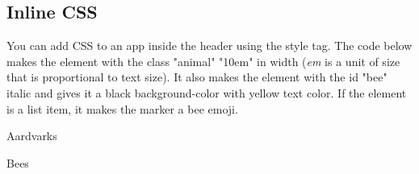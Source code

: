 \documentclass[
  oneside]{book}
\newenvironment{Shaded}{\begin{snugshade}}{\end{snugshade}}
\newcommand{\AttributeTok}[1]{\textcolor[rgb]{0.77,0.63,0.00}{#1}}
\newcommand{\FunctionTok}[1]{\textcolor[rgb]{0.00,0.00,0.00}{#1}}
\newcommand{\NormalTok}[1]{#1}
\newcommand{\OtherTok}[1]{\textcolor[rgb]{0.56,0.35,0.01}{#1}}
\newcommand{\SpecialCharTok}[1]{\textcolor[rgb]{0.00,0.00,0.00}{#1}}
\newcommand{\StringTok}[1]{\textcolor[rgb]{0.31,0.60,0.02}{#1}}
\begin{document}
\hypertarget{inline-css}{%
\subsection{Inline CSS}\label{inline-css}}

You can add CSS to an app inside the header using the style tag. The code below makes the element with the \AttributeTok{class} \StringTok{"animal"} \StringTok{"10em"} in \NormalTok{width} (\emph{em} is a unit of size that is proportional to text size). It also makes the element with the \AttributeTok{id} \StringTok{"bee"} italic and gives it a black \AttributeTok{background-color} with yellow text \AttributeTok{color}. If the element is a list item, it makes the marker a bee emoji.

\begin{Shaded}
\end{Shaded}

Aardvarks

Bees
\end{document}
